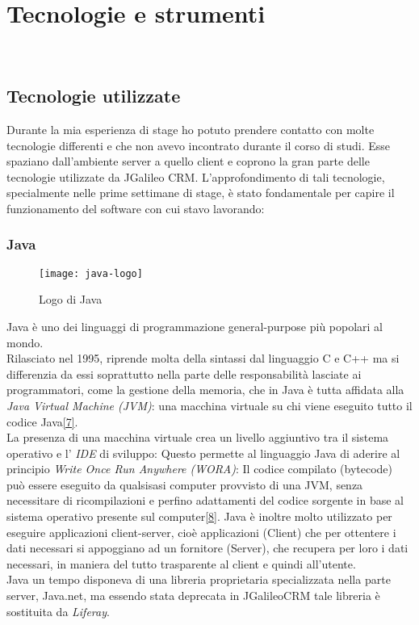 \null\newpage
\chapter{Tecnologie e strumenti}
\label{cap:tecnologie-strumenti}

\\

\section{Tecnologie utilizzate}
Durante la mia esperienza di stage ho potuto prendere contatto con molte tecnologie differenti e che non avevo incontrato durante il corso di studi. Esse spaziano dall'ambiente server a quello client e coprono la gran parte delle tecnologie utilizzate da JGalileo CRM. L'approfondimento di tali tecnologie, specialmente nelle prime settimane di stage, è stato fondamentale per capire il funzionamento del software con cui stavo lavorando: \\
\subsection{Java}
\begin{figure}[h]
	\centering
	\texttt{[image: java-logo]}
	\caption{Logo di Java}
\end{figure}
Java è uno dei linguaggi di programmazione general-purpose più popolari al mondo. \\
Rilasciato nel 1995, riprende molta della sintassi dal linguaggio C e C++ ma si differenzia da essi soprattutto  nella parte delle responsabilità lasciate ai programmatori, come la gestione della memoria, che in Java è tutta affidata alla \emph{Java Virtual Machine (JVM)}: una macchina virtuale su chi viene eseguito tutto il codice Java\hyperlink{07}{[7]}.\\
La presenza di una macchina virtuale crea un livello aggiuntivo tra il sistema operativo e l' \emph{IDE} di sviluppo: Questo permette al linguaggio Java di aderire al principio \emph{Write Once Run Anywhere (WORA)}: Il codice compilato (bytecode) può essere eseguito da qualsisasi computer provvisto di una JVM, senza necessitare di ricompilazioni e perfino adattamenti del codice sorgente in base al sistema operativo presente sul computer\hyperlink{08}{[8]}.
Java è inoltre molto utilizzato per eseguire applicazioni client-server, cioè applicazioni (Client) che per ottentere i dati necessari si appoggiano ad un fornitore (Server), che recupera per loro i dati necessari, in maniera del tutto trasparente al client e quindi all'utente.\\
Java un tempo disponeva di una libreria proprietaria specializzata nella parte server, Java.net, ma essendo stata deprecata in JGalileoCRM tale libreria è sostituita da \emph{Liferay}.\\

